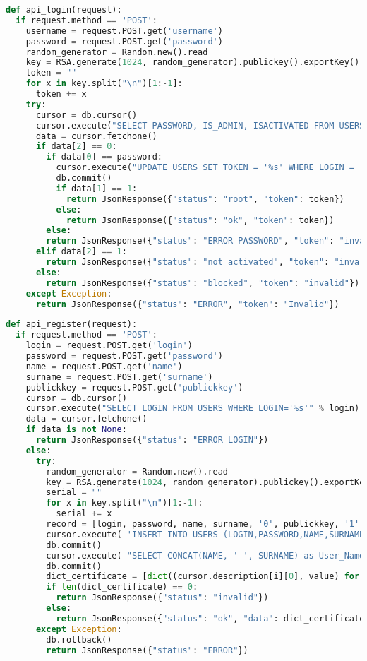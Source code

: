 {\footnotesize 
\begin{lstlisting}[caption={API logowania}, label={lst:serwer login}, language=Python]	
def api_login(request):
  if request.method == 'POST':
    username = request.POST.get('username')
    password = request.POST.get('password')
    random_generator = Random.new().read
    key = RSA.generate(1024, random_generator).publickey().exportKey()
    token = ""
    for x in key.split("\n")[1:-1]:
      token += x
    try:
      cursor = db.cursor()
      cursor.execute("SELECT PASSWORD, IS_ADMIN, ISACTIVATED FROM USERS WHERE login='%s'" % username)
      data = cursor.fetchone()
      if data[2] == 0:
        if data[0] == password:
          cursor.execute("UPDATE USERS SET TOKEN = '%s' WHERE LOGIN = '%s'" % (token, username))
          db.commit()
          if data[1] == 1:
            return JsonResponse({"status": "root", "token": token})
          else:
            return JsonResponse({"status": "ok", "token": token})
        else:
        return JsonResponse({"status": "ERROR PASSWORD", "token": "invalid"})
      elif data[2] == 1:
        return JsonResponse({"status": "not activated", "token": "invalid"})
      else:
        return JsonResponse({"status": "blocked", "token": "invalid"})
    except Exception:
      return JsonResponse({"status": "ERROR", "token": "Invalid"})
\end{lstlisting}}

\newpage
{\footnotesize
\begin{lstlisting}[caption={API rejestracji}, label={lst:serwer register}, language=Python]	
def api_register(request):
  if request.method == 'POST':
    login = request.POST.get('login')
    password = request.POST.get('password')
    name = request.POST.get('name')
    surname = request.POST.get('surname')
    publickkey = request.POST.get('publickkey')
    cursor = db.cursor()
    cursor.execute("SELECT LOGIN FROM USERS WHERE LOGIN='%s'" % login)
    data = cursor.fetchone()
    if data is not None:
      return JsonResponse({"status": "ERROR LOGIN"})
    else:
      try:
        random_generator = Random.new().read
        key = RSA.generate(1024, random_generator).publickey().exportKey()
        serial = ""
        for x in key.split("\n")[1:-1]:
          serial += x
        record = [login, password, name, surname, '0', publickkey, '1', serial, datetime.now().replace(year=datetime.now().year + 1)]
        cursor.execute( 'INSERT INTO USERS (LOGIN,PASSWORD,NAME,SURNAME,IS_ADMIN,PUBLIC_KEY, ISACTIVATED, Serial_number, Validitiy_period) VALUES(%s,%s,%s,%s,%s,%s,%s,%s,%s)', record)
        db.commit()
        cursor.execute( "SELECT CONCAT(NAME, ' ', SURNAME) as User_Name, LOGIN as Issuer_name,  PUBLIC_KEY, Serial_number, Validitiy_period, Version, Signature_Algorithm_Identifier, Hash_Algorithm FROM `users` WHERE `LOGIN` = '%s'" % (login))
        db.commit()
        dict_certificate = [dict((cursor.description[i][0], value) for i, value in enumerate(row)) for row in cursor.fetchall()]
        if len(dict_certificate) == 0:
          return JsonResponse({"status": "invalid"})
        else:
          return JsonResponse({"status": "ok", "data": dict_certificate})
      except Exception:
        db.rollback()
        return JsonResponse({"status": "ERROR"})
\end{lstlisting}}
\newpage
